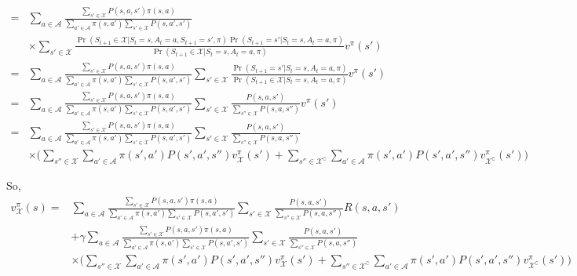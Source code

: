 \documentclass[]{article}
\begin{document}
\begin{enumerate}
{\begin{align}
				=& \sum_{a \in \mathcal A} \frac{\sum_{s' \in \mathcal X} P(s, a, s') \pi(s, a)}{\sum_{a' \in \mathcal A} \pi(s, a') \sum_{s' \in \mathcal X} P(s, a', s')} \\
				& \times \sum_{s' \in \mathcal X} \frac{\Pr(S_{t+1} \in \mathcal X | S_t = s, A_t = a, S_{t+1} = s', \pi) \Pr(S_{t+1} = s' | S_t = s, A_t = a, \pi)}{\Pr(S_{t+1} \in \mathcal X | S_t = s, A_t = a, \pi)} v^\pi(s') \\
				=& \sum_{a \in \mathcal A} \frac{\sum_{s' \in \mathcal X} P(s, a, s') \pi(s, a)}{\sum_{a' \in \mathcal A} \pi(s, a') \sum_{s' \in \mathcal X} P(s, a', s')} \sum_{s' \in \mathcal X} \frac{\Pr(S_{t+1} = s' | S_t = s, A_t = a, \pi)}{\Pr(S_{t+1} \in \mathcal X | S_t = s, A_t = a, \pi)} v^\pi(s') \\
				=& \sum_{a \in \mathcal A} \frac{\sum_{s' \in \mathcal X} P(s, a, s') \pi(s, a)}{\sum_{a' \in \mathcal A} \pi(s, a') \sum_{s' \in \mathcal X} P(s, a', s')} \sum_{s' \in \mathcal X} \frac{P(s, a, s')}{\sum_{s'' \in \mathcal X} P(s, a, s'')} v^\pi(s') \\
				=& \sum_{a \in \mathcal A} \frac{\sum_{s' \in \mathcal X} P(s, a, s') \pi(s, a)}{\sum_{a' \in \mathcal A} \pi(s, a') \sum_{s' \in \mathcal X} P(s, a', s')} \sum_{s' \in \mathcal X} \frac{P(s, a, s')}{\sum_{s'' \in \mathcal X} P(s, a, s'')} \\
				& \times \bigg( \sum_{s'' \in \mathcal X} \sum_{a' \in \mathcal A} \pi(s', a') P(s', a', s'') v^\pi_{\mathcal  X}(s') + \sum_{s'' \in \mathcal  X^\complement} \sum_{a' \in \mathcal A} \pi(s', a') P(s', a', s'') v^\pi_{\mathcal  X^\complement}(s') \bigg)
			    \end{align}

So, 
			\begin{align}
			         v^\pi_{\mathcal X}(s)=& \sum_{a \in \mathcal A} \frac{\sum_{s' \in \mathcal X} P(s, a, s') \pi(s, a)}{\sum_{a' \in \mathcal A} \pi(s, a') \sum_{s' \in \mathcal X} P(s, a', s')} \sum_{s' \in \mathcal X} \frac{P(s, a, s')}{\sum_{s'' \in \mathcal X} P(s, a, s'')} R(s, a, s') \\
				& + \gamma \sum_{a \in \mathcal A} \frac{\sum_{s' \in \mathcal X} P(s, a, s') \pi(s, a)}{\sum_{a' \in \mathcal A} \pi(s, a') \sum_{s' \in \mathcal X} P(s, a', s')} \sum_{s' \in \mathcal X} \frac{P(s, a, s')}{\sum_{s'' \in \mathcal X} P(s, a, s'')} \\
				& \times \bigg( \sum_{s'' \in \mathcal X} \sum_{a' \in \mathcal A} \pi(s', a') P(s', a', s'') v^\pi_{\mathcal  X}(s') + \sum_{s'' \in \mathcal  X^\complement} \sum_{a' \in \mathcal A} \pi(s', a') P(s', a', s'') v^\pi_{\mathcal  X^\complement}(s') \bigg)
			    \end{align}


}
\end{enumerate}
\end{document}
